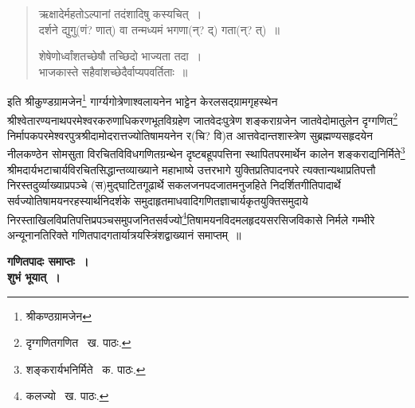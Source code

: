 \documentclass[11pt, openany]{book}
\begin{document}
\begin{quote}
{\qt ऋक्षादेर्महतोऽल्पानां तदंशादिषु कस्यचित्~।\\
दर्शने द्युगु(णं? णात्) वा तन्मध्यमं भगणा(न्? द्) गता(न्? त्)~॥

शेषेणोर्ध्वांशतच्छेषौ तच्छिदो भाज्यता तदा~।\\
भाजकास्ते सहैवांशच्छेदैर्वाप्यपवर्तिताः~॥}
\end{quote}
\noindent इति श्रीकुण्डग्रामजेन\renewcommand{\thefootnote}{१}\footnote{श्रीकण्ठग्रामजेन} गार्ग्यगोत्रेणाश्वलायनेन भाट्टेन केरलसद्ग्रामगृहस्थेन श्रीश्वेतारण्यनाथपरमेश्वरकरुणाधिकरणभूतविग्रहेण जातवेदःपुत्रेण शङ्कराग्रजेन जातवेदोमातुलेन दृग्गणित\renewcommand{\thefootnote}{२}\footnote{दृग्गणितगणित \textendash\ ख. पाठः.}  निर्मापकपरमेश्वरपुत्रश्रीदामोदरात्तज्योतिषामयनेन र(चि? वि)त आत्तवेदान्तशास्त्रेण सुब्रह्मण्यसहृदयेन नीलकण्ठेन सोमसुता
विरचितविविधगणितग्रन्थेन दृष्टबहूपपत्तिना स्थापितपरमार्थेन कालेन शङ्कराद्यनिर्मिते\renewcommand{\thefootnote}{३}\footnote{शङ्करार्यभनिर्मिते \textendash\ क. पाठः.} श्रीमदार्यभटाचार्यविरचितसिद्धान्तव्याख्याने महाभाष्ये उत्तरभागे युक्तिप्रतिपादनपरे त्यक्तान्यथाप्रतिपत्तौ निरस्तदुर्व्याख्याप्रपञ्चे (स)मुद्घाटितगूढार्थे सकलजनपदजातमनुजहिते निदर्शितगीतिपादार्थे सर्वज्योतिषामयनरहस्यार्थनिदर्शके समुदाहृतमाधवादिगणितज्ञाचार्यकृतयुक्तिसमुदाये निरस्ताखिलविप्रतिपत्तिप्रपञ्चसमुपजनितसर्वज्यो\renewcommand{\thefootnote}{४}\footnote{कलज्यो \textendash\ ख. पाठः.}तिषामयनविदमलहृदयसरसिजविकासे निर्मले गम्भीरे अन्यूनानतिरिक्ते गणितपादगतार्यात्रयस्त्रिंशद्वाख्यानं समाप्तम्~॥
		
\vspace{2cm}		
\begin{center} 
\textbf{गणितपादः समाप्तः~।}\\
\vspace{.5cm}
\textbf{शुभं भूयात्~।}
\end{center}
\end{document}
